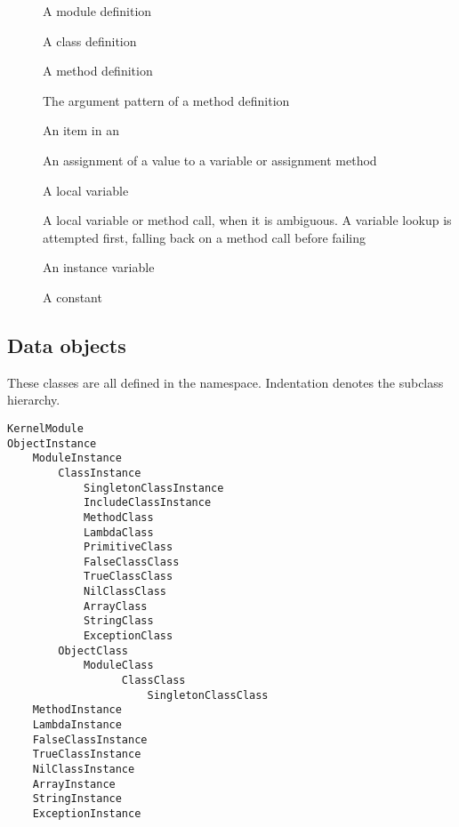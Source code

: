 \begin{description}
  \item[] A module definition
  
  \item[] A class definition
  
  \item[] A method definition
  
  \item[] The argument pattern of a method definition
  
  \item[] An item in an 
  
  \item[] An assignment of a value to a variable or assignment method
  
  \item[] A local variable
  
  \item[] A local variable or method call, when it is ambiguous. A variable lookup is attempted first, falling back on a method call before failing
  
  \item[] An instance variable
  
  \item[] A constant
\end{description}

\subsection{Data objects}

These classes are all defined in the  namespace. Indentation denotes the subclass hierarchy.

\begin{minipage}{\textwidth}
\begin{verbatim}
KernelModule
ObjectInstance
    ModuleInstance
        ClassInstance
            SingletonClassInstance
            IncludeClassInstance
            MethodClass
            LambdaClass
            PrimitiveClass
            FalseClassClass
            TrueClassClass
            NilClassClass
            ArrayClass
            StringClass
            ExceptionClass
        ObjectClass
            ModuleClass
                  ClassClass
                      SingletonClassClass
    MethodInstance
    LambdaInstance
    FalseClassInstance
    TrueClassInstance
    NilClassInstance
    ArrayInstance
    StringInstance
    ExceptionInstance
\end{verbatim}
\end{minipage}


